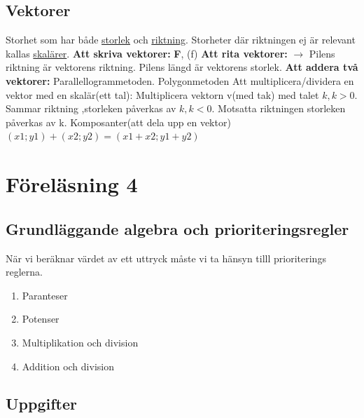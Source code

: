 \documentclass[a4paper,10pt]{article}
\begin{document}
\begin{flushleft}
    \subsection{Vektorer}
    Storhet som har både \underline{storlek} och \underline{riktning}.\newline
    Storheter där riktningen ej är relevant kallas \underline{skalärer}.\newline
    \textbf{Att skriva vektorer:}\newline
    \textbf{F}, (f)\newline
    \textbf{Att rita vektorer:}\newline
    $ \longrightarrow $\newline
    Pilens riktning är vektorens riktning.\newline
    Pilens längd är vektorens storlek.\newline
    \textbf{Att addera två vektorer:}\newline
    Parallellogrammetoden.\newline
    Polygonmetoden\newline
    Att multiplicera/dividera en vektor med en skalär(ett tal):\newline
    Multiplicera vektorn v(med tak) med talet $ k, k>0 $.\newline
    Sammar riktning ,storleken påverkas av $ k, k<0 $.\newline
    Motsatta riktningen storleken påverkas av k.\newline
    Komposanter(att dela upp en vektor)
    $ (x1;y1)+(x2;y2) = (x1+x2;y1+y2) $

  \section{Föreläsning 4}
    \subsection{Grundläggande algebra och prioriteringsregler}
    När vi beräknar värdet av ett uttryck måste vi ta hänsyn tilll prioriterings reglerna.
    \begin{enumerate}
      \item Paranteser
      \item Potenser
      \item Multiplikation och division
      \item Addition och division 
    \end{enumerate}
    \subsection{Uppgifter}

\end{flushleft}
\end{document}

